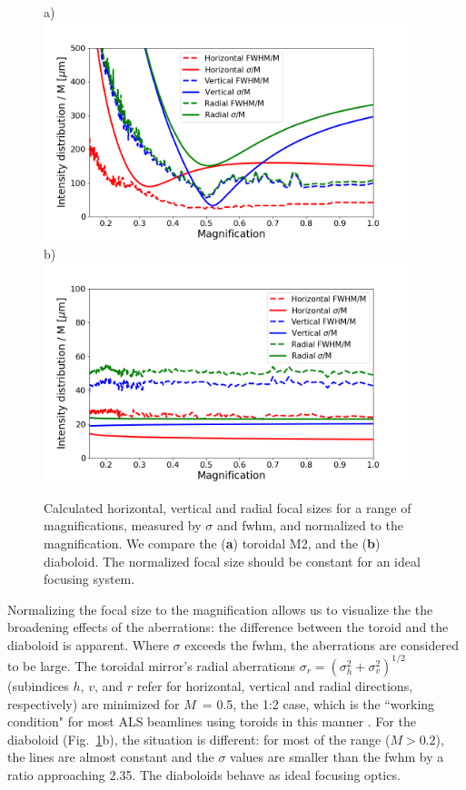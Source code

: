 \documentclass{iucr}       %
\begin{document}
\begin{figure}\label{fig:scan}
\flushleft
a)\\
\centering
\includegraphics[width=0.95\textwidth,trim=1cm 0.1cm 1cm 0.5cm,clip=true]{figures/scan_toroid.png}\\
\flushleft
b)\\
\centering
\includegraphics[width=0.95\textwidth,trim=1cm 0.1cm 1cm 0.5cm,clip=true]{figures/scan_diaboloid.png}\\
\caption{Calculated horizontal, vertical and radial focal sizes for a range of magnifications, measured by $\sigma$ and fwhm, and normalized to the magnification. We compare the (\textbf{a}) toroidal M2, and the (\textbf{b}) diaboloid. The normalized focal size should be constant for an ideal focusing system.}
\end{figure}

Normalizing the focal size to the magnification allows us to visualize the the broadening effects of the aberrations: the difference between the toroid and the diaboloid is apparent. Where $\sigma$ exceeds the fwhm, the aberrations are considered to be large. The toroidal mirror's radial aberrations $\sigma_r = (\sigma_h^2 + \sigma_v^2)^{1/2}$ (subindices $h$, $v$, and $r$ refer for horizontal, vertical and radial directions, respectively) are minimized for $M$~= 0.5, the 1:2 case, which is the ``working condition" for most ALS beamlines using toroids in this manner \cite{MacDowell2004}. For the diaboloid (Fig.~\ref{fig:scan}b), the situation is different: for most of the range ($M > 0.2$), the lines are almost constant and the $\sigma$ values are smaller than the fwhm by a ratio approaching 2.35. The diaboloids behave as ideal focusing optics.
\end{document}

